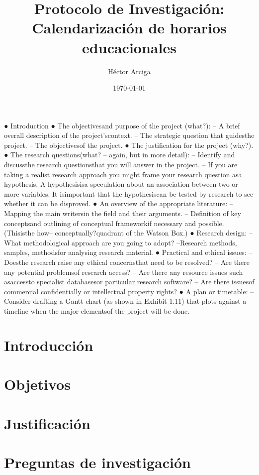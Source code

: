 \documentclass[draft,12pt,headsepline,footsepline,paper=letter]{scrreprt}
\begin{document}
\title{Protocolo de Investigación: Calendarización de horarios educacionales}
\author{Héctor Arciga}
\date{\today}

\maketitle

● Introduction
● The objectivesand purpose of the project (what?):
– A brief overall description of the project’scontext.
– The strategic question that guidesthe project.
– The objectivesof the project.
● The justification for the project (why?).
● The research questions(what? – again, but in more detail):
– Identify and discussthe research questionsthat you will answer in the
project.
– If you are taking a realist research approach you might frame your
research question asa hypothesis. A hypothesisisa speculation about
an association between two or more variables. It isimportant that the
hypothesiscan be tested by research to see whether it can be
disproved. 
● An overview of the appropriate literature:
– Mapping the main writersin the field and their arguments.
– Definition of key conceptsand outlining of conceptual frameworkif
necessary and possible. (Thisisthe how– conceptually?quadrant of
the Watson Box.)
● Research design:
– What methodological approach are you going to adopt?
–Research methods, samples, methodsfor analysing research material.
● Practical and ethical issues:
–Doesthe research raise any ethical concernsthat need to be resolved?
– Are there any potential problemsof research access?
– Are there any resource issues such asaccessto specialist databasesor
particular research software?
– Are there issuesof commercial confidentially or intellectual property
rights?
● A plan or timetable:
– Consider drafting a Gantt chart (as shown in Exhibit 1.11) that plots
against a timeline when the major elementsof the project will be done.

\section{Introducción}

\section{Objetivos}
\section{Justificación}
\section{Preguntas de investigación}
\end{document}
